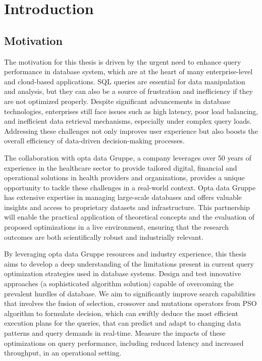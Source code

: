 \section{Introduction}
\subsection{Motivation}
The motivation for this thesis is driven by the urgent need to enhance query performance in database system, which are at the heart of many enterprise-level and cloud-based applications. SQL queries are essential for data manipulation and analysis, but they can also be a source of frustration and inefficiency if they are not optimized properly. Despite significant advancements in database technologies, enterprises still face issues such as high latency, poor load balancing, and inefficient data retrieval mechanisms, especially under complex query loads. Addressing these challenges not only improves user experience but also boosts the overall efficiency of data-driven decision-making processes.\vspace{.4cm}

The collaboration with opta data Gruppe, a company leverages over 50 years of experience in the healthcare sector to provide tailored digital, financial and operational solutions in health providers and organizations, provides a unique opportunity to tackle these challenges in a real-world context. Opta data Gruppe has extensive expertise in managing large-scale databases and offers valuable insights and access to proprietary datasets and infrastructure. This partnership will enable the practical application of theoretical concepts and the evaluation of proposed optimizations in a live environment, ensuring that the research outcomes are both scientifically robust and industrially relevant.\vspace{.4cm}

By leveraging opta data Gruppe resources and industry experience, this thesis aims to develop a deep understanding of the limitations present in current query optimization strategies used in database systems. Design and test innovative approaches (a sophisticated algorithm solution) capable of overcoming the prevalent hurdles of database. We aim to significantly improve search capabilities that involves the fusion of selection, crossover and mutations operators from PSO algorithm to formulate decision, which can swiftly deduce the most efficient execution plans for the queries, that can predict and adapt to changing data patterns and query demands in real-time. Measure the impacts of these optimizations on query performance, including reduced latency and increased throughput, in an operational setting.

